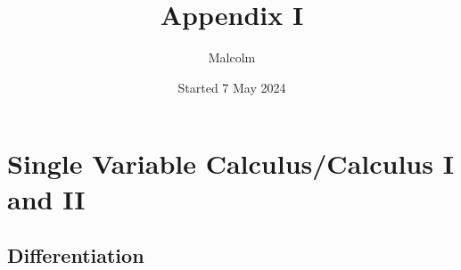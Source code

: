 \documentclass{report}
\title{Appendix I}
\date{Started 7 May 2024}
\author{Malcolm}
\begin{document}
\maketitle
\tableofcontents

\newpage
\appendix
\chapter{Single Variable Calculus/Calculus I and II}
\label{fundamentals}


\section{Differentiation}
\label{fundamentals:differentiation}
\end{document}
